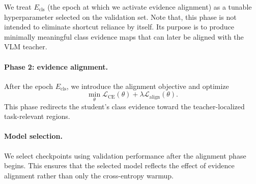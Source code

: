 We treat $E_{\mathrm{cls}}$ (the epoch at which we activate evidence alignment) as a tunable hyperparameter selected on the validation set. Note that, this phase is not intended to eliminate shortcut reliance by itself. Its purpose is to produce minimally meaningful class evidence maps that can later be aligned with the VLM teacher.

\paragraph{Phase 2: evidence alignment.}
After the epoch $E_{\mathrm{cls}}$, we introduce the alignment objective and optimize
\begin{equation}
\min_{\theta}
\mathcal{L}_{\mathrm{CE}}(\theta)
+
\lambda \mathcal{L}_{\mathrm{align}}(\theta).
\end{equation}
This phase redirects the student's class evidence toward the teacher-localized task-relevant regions.

\paragraph{Model selection.}
We select checkpoints using validation performance after the alignment phase begins. This ensures that the selected model reflects the effect of evidence alignment rather than only the cross-entropy warmup. %


